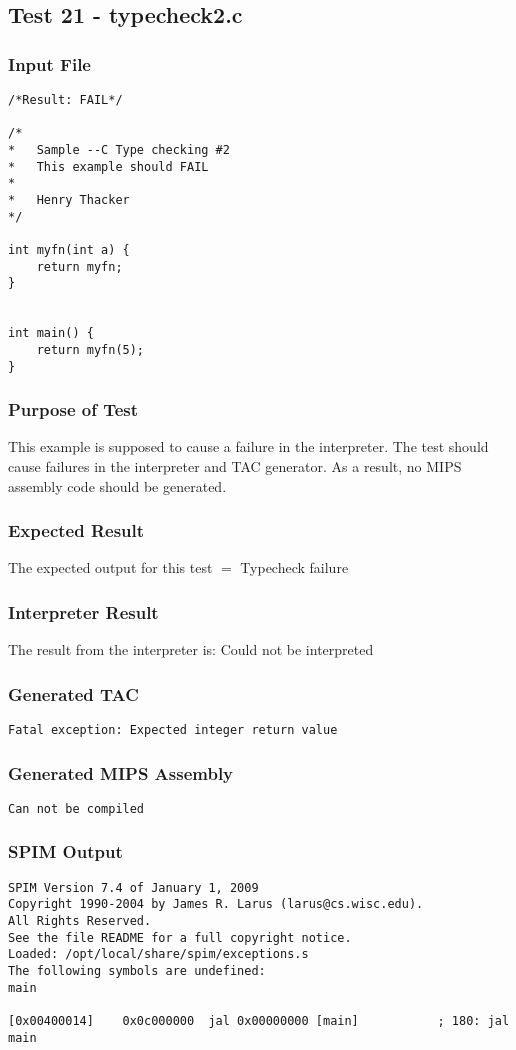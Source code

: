 \subsection{Test 21 - typecheck2.c}
\subsubsection{Input File}
\begin{lstlisting}[showstringspaces=false,breaklines=true,backgroundcolor=\color{light-gray}, captionpos=b]
/*Result: FAIL*/

/*
*	Sample --C Type checking #2
*	This example should FAIL
*
*	Henry Thacker
*/

int myfn(int a) {
	return myfn;
}


int main() {
	return myfn(5);
}
\end{lstlisting}\subsubsection{Purpose of Test}
This example is supposed to cause a failure in the interpreter. The test should cause failures in the interpreter and TAC generator. As a result, no MIPS assembly code should be generated.
\subsubsection{Expected Result}
The expected output for this test $=$ Typecheck failure
\subsubsection{Interpreter Result}
The result from the interpreter is: Could not be interpreted
\subsubsection{Generated TAC}
\begin{lstlisting}[showstringspaces=false,breaklines=true,backgroundcolor=\color{light-gray}, captionpos=b]
Fatal exception: Expected integer return value

\end{lstlisting}\subsubsection{Generated MIPS Assembly}
\begin{lstlisting}[showstringspaces=false,breaklines=true,backgroundcolor=\color{light-gray}, captionpos=b]
Can not be compiled
\end{lstlisting}\subsubsection{SPIM Output}
\begin{verbatim}
SPIM Version 7.4 of January 1, 2009
Copyright 1990-2004 by James R. Larus (larus@cs.wisc.edu).
All Rights Reserved.
See the file README for a full copyright notice.
Loaded: /opt/local/share/spim/exceptions.s
The following symbols are undefined:
main

[0x00400014]	0x0c000000  jal 0x00000000 [main]           ; 180: jal main
\end{verbatim}
